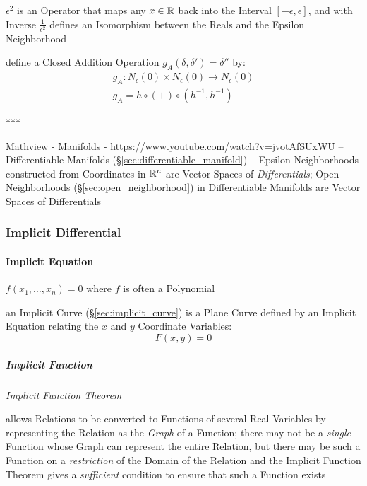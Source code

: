 $\epsilon^2$ is an Operator that maps any $x \in \mathbb{R}$ back into the Interval
$[-\epsilon, \epsilon]$, and with Inverse $\frac{1}{\epsilon^2}$ defines an
Isomorphism between the Reals and the Epsilon Neighborhood

define a Closed Addition Operation $g_A(\delta, \delta') = \delta''$ by:
\begin{align*}
  g_A : N_\epsilon(0) \times N_\epsilon(0) \rightarrow N_\epsilon(0) \\
  g_A = h \circ (+) \circ (h^{-1}, h^{-1})
\end{align*}

***

Mathview - Manifolds - \url{https://www.youtube.com/watch?v=jvotAfSUxWU}
--
Differentiable Manifolds (\S\ref{sec:differentiable_manifold}) -- Epsilon
Neighborhoods constructed from Coordinates in $\mathbb{R}^n$ are Vector Spaces of
\emph{Differentials}; Open Neighborhoods (\S\ref{sec:open_neighborhood}) in
Differentiable Manifolds are Vector Spaces of Differentials



\subsubsection{Implicit Differential}\label{sec:implicit_differential}

\paragraph{Implicit Equation}\label{sec:implicit_equation}\hfill


$f(x_1, \ldots, x_n) = 0$ where $f$ is often a Polynomial

\fist an Implicit Curve (\S\ref{sec:implicit_curve}) is a Plane Curve defined by
an Implicit Equation relating the $x$ and $y$ Coordinate Variables:
\[
  F(x,y) = 0
\]



\subparagraph{Implicit Function}\label{sec:implicit_function}\hfill

\emph{Implicit Function Theorem}

allows Relations to be converted to Functions of several Real Variables by
representing the Relation as the \emph{Graph} of a Function; there may not be a
\emph{single} Function whose Graph can represent the entire Relation, but there
may be such a Function on a \emph{restriction} of the Domain of the Relation and
the Implicit Function Theorem gives a \emph{sufficient} condition to ensure that
such a Function exists

